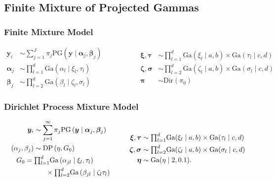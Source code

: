 \documentclass[aspectratio=169]{beamer}
\begin{document}
\subsection*{Finite Mixture of Projected Gammas}
\begin{frame}
  \frametitle{Finite Mixture Model}
  \begin{equation*}
    \begin{aligned}
      \bm{ y}_i &\sim \sum_{j = 1}^J\pi_j\text{PG}\left(\bm{ y}\mid \bm{ \alpha}_j, \bm{ \beta}_j\right)\\
      \bm{ \alpha}_j &\sim {\textstyle \prod}_{l = 1}^d \text{Ga}\left(\alpha_l\mid\xi_l,\tau_l\right)\\
      \bm{ \beta}_j &\sim {\textstyle \prod}_{l = 2}^d \text{Ga}\left(\beta_l\mid\zeta_l,\sigma_l\right)
    \end{aligned}
    \hspace{2cm}
    \begin{aligned}
      \bm{ \xi},\bm{\tau} &\sim {\textstyle \prod}_{l = 1}^d \text{Ga}(\xi_l\mid a,b)
                \times \text{Ga}(\tau_l\mid c,d)\\
      \bm{ \zeta},\bm{\sigma} &\sim {\textstyle\prod}_{l = 2}^d\text{Ga}(\zeta_l \mid a,b)
              \times \text{Ga}(\sigma_l\mid c,d)\\
      \bm{ \pi} &\sim \text{Dir}(\pi_0)
    \end{aligned}
  \end{equation*}
\end{frame} %

\begin{frame}
  \frametitle{Dirichlet Process Mixture Model}
  \begin{equation*}
    \begin{aligned}
      \bm{ y}_i &\sim \sum_{j = 1}^{\infty}\pi_j\text{PG}\left(\bm{ y}\mid \bm{ \alpha}_j, \bm{ \beta}_j\right)\\
      (\alpha_j,\beta_j) &\sim \text{DP}\left(\eta, G_0\right)\\
      &~\hspace{-1cm}G_0 = {\textstyle\prod}_{l = 1}^d\text{Ga}\left(\alpha_{jl}\mid\xi_{l},\tau_{l}\right)\\
      &~\hspace{0.5cm}\times{\textstyle\prod}_{l=2}^d\text{Ga}\left(\beta_{jl}\mid\zeta_{l}\tau_{l}\right)
    \end{aligned}
    \hspace{1cm}
    \begin{aligned}
      \bm{ \xi},\bm{ \tau} &\sim {\textstyle \prod}_{l = 1}^d \text{Ga}(\xi_l\mid a,b)
              \times \text{Ga}(\tau_l\mid c,d)\\
      \bm{ \zeta},\bm{\sigma} &\sim {\textstyle\prod}_{l = 2}^d\text{Ga}(\zeta_l \mid a,b)
              \times \text{Ga}(\sigma_l\mid c,d)\\
      \bm{ \eta} &\sim \text{Ga}(\eta \mid 2, 0.1).
    \end{aligned}
  \end{equation*}
\end{frame}
\end{document}
